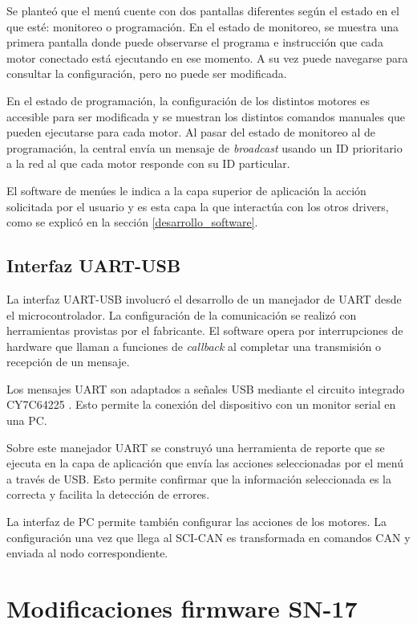 Se planteó que el menú cuente con dos pantallas diferentes según el estado en el que esté: monitoreo o programación. En el estado de monitoreo, se muestra una primera pantalla donde puede observarse el programa e instrucción que cada motor conectado está ejecutando en ese momento. A su vez puede navegarse para consultar la configuración, pero no puede ser modificada.

En el estado de programación, la configuración de los distintos motores es accesible para ser modificada y se muestran los distintos comandos manuales que pueden ejecutarse para cada motor. Al pasar del estado de monitoreo al de programación, la central envía un mensaje de \textit{broadcast} usando un ID prioritario a la red al que cada motor responde con su ID particular.

El software de menúes le indica a la capa superior de aplicación la acción solicitada por el usuario y es esta capa la que interactúa con los otros drivers, como se explicó en la sección \ref{desarrollo_software}.

\subsection{Interfaz UART-USB}

La interfaz UART-USB involucró el desarrollo de un manejador de UART desde el microcontrolador. La configuración de la comunicación se realizó con herramientas provistas por el fabricante. El software opera por interrupciones de hardware que llaman a funciones de \textit{callback} al completar una transmisión o recepción de un mensaje.

Los mensajes UART son adaptados a señales USB mediante el circuito integrado CY7C64225 \citep{web_interfaz_USB_UART}. Esto permite la conexión del dispositivo con un monitor serial en una PC.

Sobre este manejador UART se construyó una herramienta de reporte que se ejecuta en la capa de aplicación que envía las acciones seleccionadas por el menú a través de USB. Esto permite confirmar que la información seleccionada es la correcta y facilita la detección de errores.

La interfaz de PC permite también configurar las acciones de los motores. La configuración una vez que llega al SCI-CAN es transformada en comandos CAN y enviada al nodo correspondiente.

\section{Modificaciones firmware SN-17}

